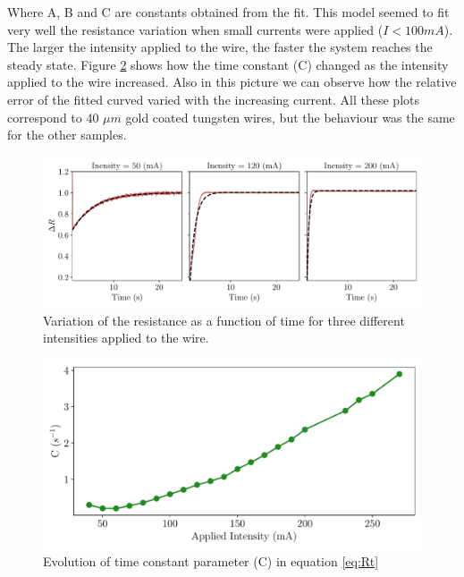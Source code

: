 Where A, B and C are constants obtained from the fit. This model seemed to fit very well the resistance variation when small currents were applied ($I < 100 mA$). The larger the intensity applied to the wire, the faster the system reaches the steady state. Figure \ref{fig:EvolParWithInt} shows how the time constant (C) changed as the intensity applied to the wire increased. Also in this picture we can observe how the relative error of the fitted curved varied with the increasing current. All these plots correspond to 40 $\mu m$ gold coated tungsten wires, but the behaviour was the same for the other samples. 

\begin{figure}[h]
    \centering
    \includegraphics[width=1.0\columnwidth]{Figure_DeltaResTime/DeltaResTime.pdf}
    \caption{Variation of the resistance as a function of time for three different intensities applied to the wire. }
    \label{fig:ResistanceWithTime}
\end{figure}

\begin{figure}[h]
    \centering
    \includegraphics[width=0.7\columnwidth]{Figure_DeltaResTime/ParamEvolution.pdf}
    \caption{Evolution of time constant parameter (C) in equation \ref{eq:Rt} }
    \label{fig:EvolParWithInt}
\end{figure}



 
